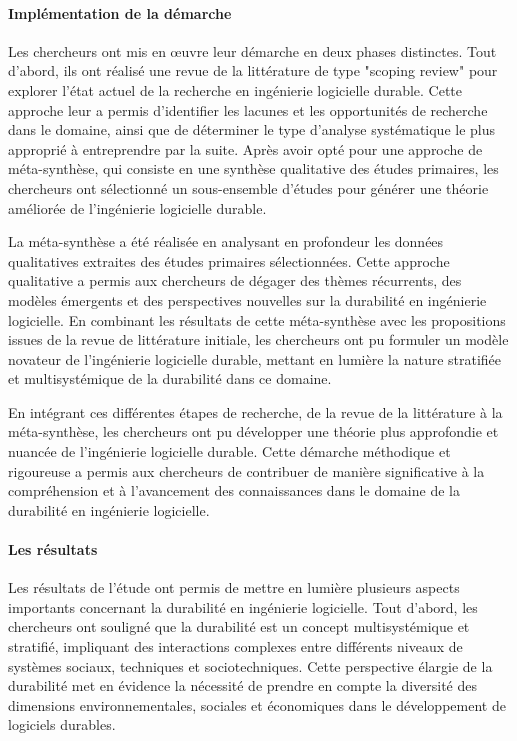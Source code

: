\paragraph{Implémentation de la démarche}
Les chercheurs ont mis en œuvre leur démarche en deux phases distinctes. Tout d'abord, ils ont réalisé une revue de la littérature de type "scoping review" pour explorer l'état actuel de la recherche en ingénierie logicielle durable. Cette approche leur a permis d'identifier les lacunes et les opportunités de recherche dans le domaine, ainsi que de déterminer le type d'analyse systématique le plus approprié à entreprendre par la suite. Après avoir opté pour une approche de méta-synthèse, qui consiste en une synthèse qualitative des études primaires, les chercheurs ont sélectionné un sous-ensemble d'études pour générer une théorie améliorée de l'ingénierie logicielle durable.

La méta-synthèse a été réalisée en analysant en profondeur les données qualitatives extraites des études primaires sélectionnées. Cette approche qualitative a permis aux chercheurs de dégager des thèmes récurrents, des modèles émergents et des perspectives nouvelles sur la durabilité en ingénierie logicielle. En combinant les résultats de cette méta-synthèse avec les propositions issues de la revue de littérature initiale, les chercheurs ont pu formuler un modèle novateur de l'ingénierie logicielle durable, mettant en lumière la nature stratifiée et multisystémique de la durabilité dans ce domaine.

En intégrant ces différentes étapes de recherche, de la revue de la littérature à la méta-synthèse, les chercheurs ont pu développer une théorie plus approfondie et nuancée de l'ingénierie logicielle durable. Cette démarche méthodique et rigoureuse a permis aux chercheurs de contribuer de manière significative à la compréhension et à l'avancement des connaissances dans le domaine de la durabilité en ingénierie logicielle.

\paragraph{Les résultats}
Les résultats de l'étude ont permis de mettre en lumière plusieurs aspects importants concernant la durabilité en ingénierie logicielle. Tout d'abord, les chercheurs ont souligné que la durabilité est un concept multisystémique et stratifié, impliquant des interactions complexes entre différents niveaux de systèmes sociaux, techniques et sociotechniques. Cette perspective élargie de la durabilité met en évidence la nécessité de prendre en compte la diversité des dimensions environnementales, sociales et économiques dans le développement de logiciels durables.

